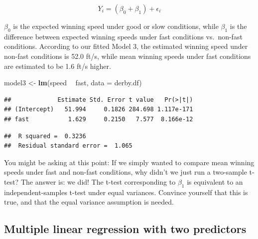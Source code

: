 \documentclass[
]{krantz}
\newenvironment{Shaded}{\begin{snugshade}}{\end{snugshade}}
\newcommand{\DataTypeTok}[1]{\textcolor[rgb]{0.27,0.27,0.27}{#1}}
\newcommand{\KeywordTok}[1]{\textcolor[rgb]{0.27,0.27,0.27}{\textbf{#1}}}
\newcommand{\NormalTok}[1]{#1}
\newcommand{\OperatorTok}[1]{\textcolor[rgb]{0.43,0.43,0.43}{\textbf{#1}}}
\newcommand{\StringTok}[1]{\textcolor[rgb]{0.5,0.5,0.5}{#1}}
\begin{document}
\begin{equation*}
Y_{i} = (\beta_{0}+\beta_{1})+\epsilon_{i}
\end{equation*}

\(\beta_{0}\) is the expected winning speed under good or slow conditions, while \(\beta_{1}\) is the difference between expected winning speeds under fast conditions vs.~non-fast conditions. According to our fitted Model 3, the estimated winning speed under non-fast conditions is 52.0 ft/s, while mean winning speeds under fast conditions are estimated to be 1.6 ft/s higher.

\begin{Shaded}
\begin{Highlighting}[]
\NormalTok{model3 <-}\StringTok{ }\KeywordTok{lm}\NormalTok{(speed }\OperatorTok{~}\StringTok{ }\NormalTok{fast, }\DataTypeTok{data =}\NormalTok{ derby.df)}
\end{Highlighting}
\end{Shaded}

\begin{verbatim}
##             Estimate Std. Error t value   Pr(>|t|)
## (Intercept)   51.994     0.1826 284.698 1.117e-171
## fast           1.629     0.2150   7.577  8.166e-12
\end{verbatim}

\begin{verbatim}
##  R squared =  0.3236 
##  Residual standard error =  1.065
\end{verbatim}

You might be asking at this point: If we simply wanted to compare mean winning speeds under fast and non-fast conditions, why didn't we just run a two-sample t-test? The answer is: we did! The t-test corresponding to \(\beta_{1}\) is equivalent to an independent-samples t-test under equal variances. Convince yourself that this is true, and that the equal variance assumption is needed.

\hypertarget{multiple-linear-regression-with-two-predictors}{%
\subsection{Multiple linear regression with two predictors}\label{multiple-linear-regression-with-two-predictors}}
\end{document}
